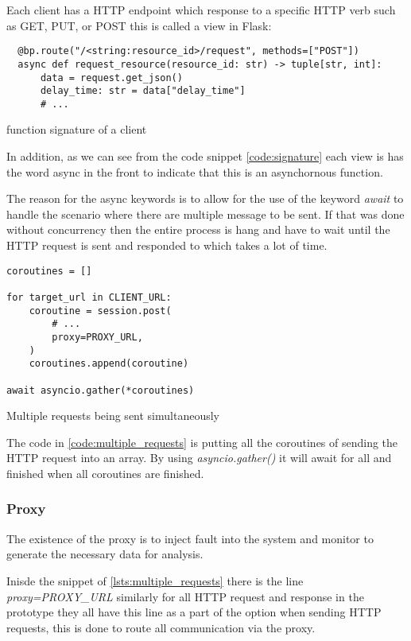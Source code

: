 Each client has a HTTP endpoint which response to a specific HTTP verb such as
GET, PUT, or POST this is called a view in Flask:

\begin{listing}[!ht]
  \begin{verbatim}
  @bp.route("/<string:resource_id>/request", methods=["POST"])
  async def request_resource(resource_id: str) -> tuple[str, int]:
      data = request.get_json()
      delay_time: str = data["delay_time"]
      # ...
  \end{verbatim}
\caption{function signature of a client}
\label{code:signature}
\end{listing}

In addition, as we can see from the code snippet \ref{code:signature}  each view is has the word 
async in the front to indicate that this is an asynchornous function. 

The reason for the async keywords is to allow for the use of the keyword 
\textit{await} to handle the scenario where there are multiple message to be 
sent. If that was done without concurrency then the entire process is hang 
and have to wait until the HTTP request is sent and responded to which takes a 
lot of time.

\begin{listing}[!ht]
\begin{verbatim}
coroutines = []

for target_url in CLIENT_URL:
    coroutine = session.post(
        # ...
        proxy=PROXY_URL,
    )
    coroutines.append(coroutine)

await asyncio.gather(*coroutines)
\end{verbatim}
\caption{Multiple requests being sent simultaneously}
\label{code:multiple_requests}
\end{listing}


The code in \ref{code:multiple_requests} is putting all the coroutines of sending the HTTP request into 
an array. By using \textit{asyncio.gather()} it will await for all and finished
when all coroutines are finished.


\subsubsection{Proxy}

The existence of the proxy is to inject fault into the system and monitor to 
generate the necessary data for analysis.

Inisde the snippet of \ref{lsts:multiple_requests} there is the line 
\textit{proxy=PROXY\_URL}
similarly for all HTTP request and response in the prototype they all have this line 
as a part of the option when sending HTTP requests, this is done to route all 
communication via the proxy.

